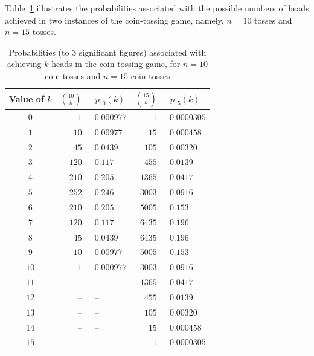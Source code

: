 Table~\ref{tab:select-replace} illustrates the probabilities associated with the possible numbers of {\sc head}s achieved in two instances of the coin-tossing game, namely, $n = 10$ tosses and $n= 15$ tosses.  
\begin{table}[htb]
\label{tab:select-replace}
\caption{Probabilities (to $3$ significant figures) associated with achieving $k$ {\sc head}s in the coin-tossing game, for $n = 10$ coin tosses and $n= 15$ coin tosses}
\begin{center}
\begin{tabular}{|c||r|l||r|l|}
\hline
Value of $k$ & $\displaystyle {10 \choose k}$ & \ $p_{10}(k)$ 
& $\displaystyle {15 \choose k}$ & \ $p_{15}(k)$ \\
\hline
\hline
$0$   &   $  1$ & \ $0.000977$ &     $   1$ &  \ $0.0000305$ \\
$1$   &   $10$ & \   $0.00977$ &      $15$ &  \   $0.000458$ \\
$2$   &   $45$ & \     $0.0439$ &    $105$ &  \     $0.00320$ \\
$3$   & $120$ & \       $0.117$ &    $455$ &  \       $0.0139$ \\
$4$   & $210$ & \      $0.205$ &   $1365$ &  \       $0.0417$ \\
$5$   & $252$ & \      $0.246$ &   $3003$ &  \       $0.0916$ \\
$6$   & $210$ & \      $0.205$ &   $5005$ &  \         $0.153$ \\
$7$   & $120$ & \      $0.117$ &   $6435$ &  \         $0.196$ \\
$8$   &   $45$ & \    $0.0439$ &   $6435$ &  \         $0.196$ \\
$9$   &   $10$ & \  $0.00977$ &   $5005$ & \          $0.153$ \\
$10$ &     $1$ & \ $0.000977$ &  $3003$ & \        $0.0916$ \\
$11$ & --        & \ --                  &   $1365$ & \        $0.0417$ \\
$12$ & --        & \ --                 &      $455$ & \        $0.0139$ \\
$13$ & --       & \ --                  &      $105$ & \      $0.00320$ \\
$14$ & --       & \ --                  &        $15$ & \    $0.000458$ \\
$15$ & --       & \ --                  &          $1$ & \  $0.0000305$  \\
\hline
\end{tabular}
\end{center}
\end{table}
